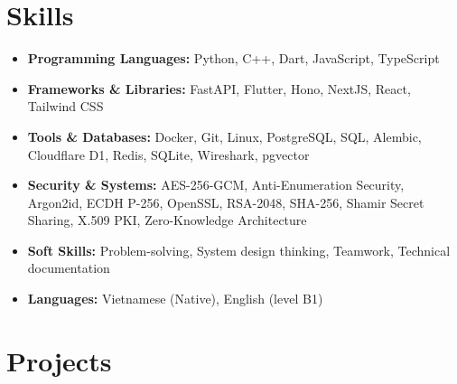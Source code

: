 \documentclass[10pt,a4paper]{article}
\begin{document}
\section*{Skills}
\begin{itemize}[leftmargin=0.15in, label={}, itemsep=0pt]
    \item \textbf{Programming Languages:} Python, C++, Dart, JavaScript, TypeScript
    \item \textbf{Frameworks \& Libraries:} FastAPI, Flutter, Hono, NextJS, React, Tailwind CSS
    \item \textbf{Tools \& Databases:} Docker, Git, Linux, PostgreSQL, SQL, Alembic, Cloudflare D1, Redis, SQLite, Wireshark, pgvector
    \item \textbf{Security \& Systems:} AES-256-GCM, Anti-Enumeration Security, Argon2id, ECDH P-256, OpenSSL, RSA-2048, SHA-256, Shamir Secret Sharing, X.509 PKI, Zero-Knowledge Architecture
    \item \textbf{Soft Skills:} Problem-solving, System design thinking, Teamwork, Technical documentation
    \item \textbf{Languages:} Vietnamese (Native), English (level B1)
\end{itemize}

\section*{Projects}
\end{document}
